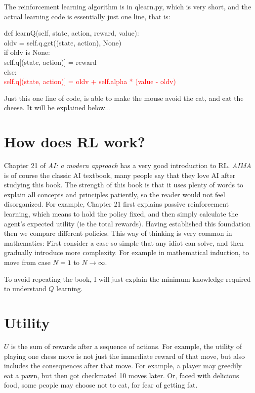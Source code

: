 \documentclass[orivec]{llncs}
\newcommand{\code}[1]{{\footnotesize{\ttfamily #1}}}
\newcommand{\tab}{\hspace*{1cm} }
\begin{document}
The reinforcement learning algorithm is in qlearn.py, which is very short, and the actual learning code is essentially just one line, that is:

\tab \code{def learnQ(self, state, action, reward, value): }\\
\tab \code{oldv = self.q.get((state, action), None) }\\
\tab \code{if oldv is None:} \\
\tab \code{\tab self.q[(state, action)] = reward }\\
\tab \code{else: }\\
\tab \code{\tab \textcolor{red}{self.q[(state, action)] = oldv + self.alpha * (value - oldv) }}

Just this one line of code, is able to make the mouse avoid the cat, and eat the cheese.  It will be explained below...

\section{How does RL work?}

Chapter 21 of \textit{AI: a modern approach} has a very good introduction to RL.  \textit{AIMA} is of course the classic AI textbook, many people say that they love AI after studying this book.  The strength of this book is that it uses plenty of words to explain all concepts and principles patiently, so the reader would not feel disorganized.  For example, Chapter 21 first explains passive reinforcement learning, which means to hold the policy fixed, and then simply calculate the agent's expected utility (ie the total rewards).  Having established this foundation then we compare different policies.  This way of thinking is very common in mathematics:  First consider a case so simple that any idiot can solve, and then gradually introduce more complexity.  For example in mathematical induction, to move from case $N=1$ to  $N \rightarrow \infty$.

To avoid repeating the book, I will just explain the minimum knowledge required to understand $Q$ learning.

\section{Utility}

$U$ is the sum of rewards after a sequence of actions.  For example, the utility of playing one chess move is not just the immediate reward of that move, but also includes the consequences after that move.  For example, a player may greedily eat a pawn, but then got checkmated 10 moves later.  Or, faced with delicious food, some people may choose not to eat, for fear of getting fat.
\end{document}
